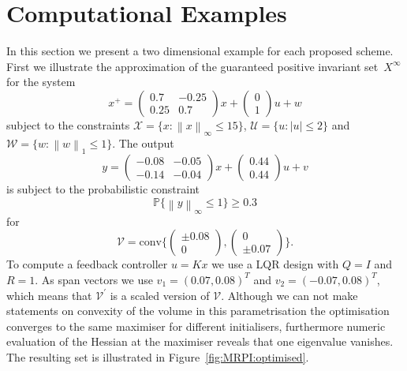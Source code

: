 \documentclass{ifacconf}
\providecommand{\abs}[1]{\left|#1\right|}
\providecommand{\norm}[1]{\left\|#1\right\|}
\providecommand{\conv}{\text{conv}}
\providecommand{\W}{\mathcal W}
\providecommand{\V}{\mathcal V}
\providecommand{\X}{\mathcal X}
\providecommand{\U}{\mathcal U}
\providecommand{\PP}{\mathbb P}
\begin{document}
\section{Computational Examples}\label{sec:examples}
%
%
%
In this section we present a two dimensional example for each proposed scheme.
%
First we illustrate the approximation of the guaranteed positive invariant set~$X^\infty$ for the system
%
\begin{equation}\label{eq:example:system:MRPI}
	x^+ = \begin{pmatrix}0.7&-0.25\\0.25&0.7\end{pmatrix}x+\begin{pmatrix}0\\1\end{pmatrix}u+w
\end{equation}
%
subject to the constraints $\X = \{x:\norm{x}_\infty\leq15\}$, $\U = \{u:\abs{u}\leq2\}$ and $\W=\{w:\norm{w}_1\leq1\}$.
%
The output 
%
\begin{equation}
	y = \begin{pmatrix}-0.08&-0.05\\
   -0.14&   -0.04\end{pmatrix}x + \begin{pmatrix}
0.44\\0.44\end{pmatrix}u + v
\end{equation}
%
is subject to the probabilistic constraint
%
\begin{equation}
	\PP\{\norm{y}_\infty\leq 1\}\geq 0.3
\end{equation}
%
for 
%
$$
\V = \conv\{\begin{pmatrix}\pm0.08\\0\end{pmatrix},\begin{pmatrix}0\\\pm0.07\end{pmatrix}\}.
$$
%
To compute a feedback controller $u=Kx$ we use a LQR design with $Q=I$ and $R=1$.
%
As span vectors we use $v_1 = (0.07,0.08)^T$ and $v_2 = (-0.07,0.08)^T$, which means that $\V^\prime$ is a scaled version of $\V$.
%
Although we can not make statements on convexity of the volume in this parametrisation the optimisation converges to the same maximiser for different initialisers, furthermore numeric evaluation of the Hessian at the maximiser reveals that one eigenvalue vanishes. 
%
The resulting set is illustrated in Figure~\ref{fig:MRPI:optimised}.
%
\end{document}
